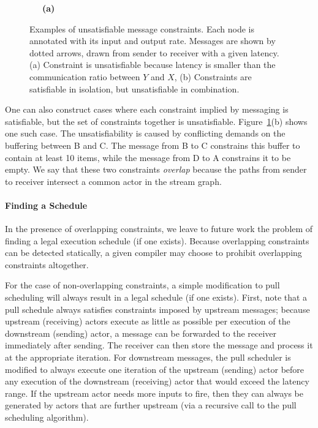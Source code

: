 \documentclass{sig-alternate}
\begin{document}
\begin{figure}[t]
\begin{center}
\hspace{0.7in}
 \vspace{6pt}

{\tiny ~}{\tiny ~}~{\bf (a)}\hspace{1in}{\bf (b)}~~~{\tiny ~}{\tiny ~}
\vspace{-3pt}
\caption{{\small Examples of unsatisfiable message constraints.  Each
node is annotated with its input and output rate.  Messages are shown
by dotted arrows, drawn from sender to receiver with a given latency.
(a) Constraint is unsatisfiable because latency is smaller than the
communication ratio between $Y$ and $X$, (b) Constraints are
satisfiable in isolation, but unsatisfiable in combination.
\protect\label{fig:infeasible}}}
\end{center}
\vspace{-18pt}
\end{figure}

One can also construct cases where each constraint implied by
messaging is satisfiable, but the set of constraints together is
unsatisfiable.  Figure~\ref{fig:infeasible}(b) shows one such case.
The unsatisfiability is caused by conflicting demands on the buffering
between B and C.  The message from B to C constrains this buffer to
contain at least 10 items, while the message from D to A constrains it
to be empty.  We say that these two constraints {\it overlap} because
the paths from sender to receiver intersect a common actor in the
stream graph.

\paragraph*{Finding a Schedule}
In the presence of overlapping constraints, we leave to future work
the problem of finding a legal execution schedule (if one exists).
Because overlapping constraints can be detected statically, a given
compiler may choose to prohibit overlapping constraints altogether.

For the case of non-overlapping constraints, a simple modification to
pull scheduling will always result in a legal schedule (if one
exists).  First, note that a pull schedule always satisfies
constraints imposed by upstream messages; because upstream (receiving)
actors execute as little as possible per execution of the downstream
(sending) actor, a message can be forwarded to the receiver
immediately after sending.  The receiver can then store the message
and process it at the appropriate iteration.  For downstream messages,
the pull scheduler is modified to always execute one iteration of the
upstream (sending) actor before any execution of the downstream
(receiving) actor that would exceed the latency range.  If the
upstream actor needs more inputs to fire, then they can always be
generated by actors that are further upstream (via a recursive call to
the pull scheduling algorithm).
\end{document}
